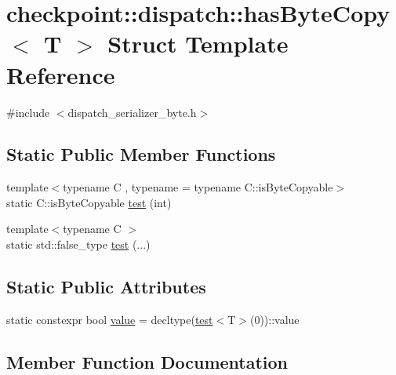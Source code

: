 \hypertarget{structcheckpoint_1_1dispatch_1_1has_byte_copy}{}\section{checkpoint\+:\+:dispatch\+:\+:has\+Byte\+Copy$<$ T $>$ Struct Template Reference}
\label{structcheckpoint_1_1dispatch_1_1has_byte_copy}


{\ttfamily \#include $<$dispatch\+\_\+serializer\+\_\+byte.\+h$>$}

\subsection*{Static Public Member Functions}
\begin{DoxyCompactItemize}
\item 
{\footnotesize template$<$typename C , typename  = typename C\+::is\+Byte\+Copyable$>$ }\\static C\+::is\+Byte\+Copyable \hyperlink{structcheckpoint_1_1dispatch_1_1has_byte_copy_a12e7f6fcfaaccb6813490910bf4c58f6}{test} (int)
\item 
{\footnotesize template$<$typename C $>$ }\\static std\+::false\+\_\+type \hyperlink{structcheckpoint_1_1dispatch_1_1has_byte_copy_aa3e33afde7209de300c78bd222ac3aff}{test} (...)
\end{DoxyCompactItemize}
\subsection*{Static Public Attributes}
\begin{DoxyCompactItemize}
\item 
static constexpr bool \hyperlink{structcheckpoint_1_1dispatch_1_1has_byte_copy_a811d900c75ba2e9b871e18283ef493ec}{value} = decltype(\hyperlink{structcheckpoint_1_1dispatch_1_1has_byte_copy_a12e7f6fcfaaccb6813490910bf4c58f6}{test}$<$T$>$(0))\+::value
\end{DoxyCompactItemize}


\subsection{Member Function Documentation}
\mbox{\label{structcheckpoint_1_1dispatch_1_1has_byte_copy_a12e7f6fcfaaccb6813490910bf4c58f6}} 
